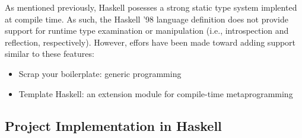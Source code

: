 \documentclass[titlepage,12pt]{article}
\newcommand{\bi}{\begin{itemize}}
\newcommand{\ei}{\end{itemize}}
\begin{document}
As mentioned previously, Haskell posesses a strong static type system
implented at compile time. As such, the Haskell '98 language definition
does not provide support for runtime type examination or manipulation
(i.e., introspection and reflection, respectively).  However, effors have been
made toward adding support similar to these features:
\bi
    \item Scrap your boilerplate: generic programming~\cite{haskell-syb}
    \item Template Haskell: an extension module for compile-time metaprogramming~\cite{haskell-th}
\ei


\newpage
\begin{appendices}
\section{Project Implementation in Haskell}
\inputminted{haskell}{src/InfixPostfix.hs}
\newpage
\inputminted{haskell}{src/InfixPostfixTest.hs}
\end{appendices}


\newpage


\end{document}
